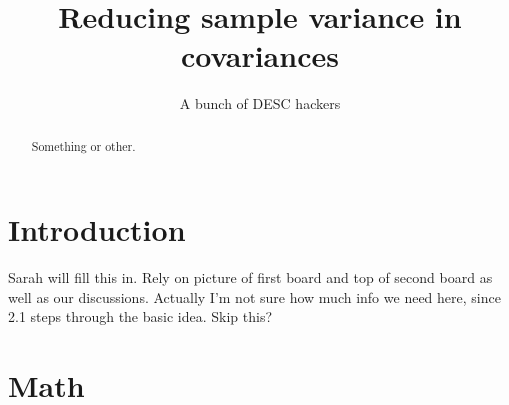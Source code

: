 \documentclass[preprint]{aastex}
\begin{document}
\title{Reducing sample variance in covariances}

\author{A bunch of DESC hackers}
\begin{abstract}
Something or other.
\end{abstract}

\section{Introduction}

Sarah will fill this in.  Rely on picture of first board and top of second board as well as our
discussions.  Actually I'm not sure how much info we need here, since 2.1 steps through the basic
idea.  Skip this?

\section{Math}

\end{document}

